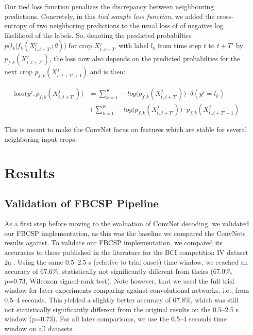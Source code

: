 Our tied loss function penalizes the discrepancy between neighbouring
predictions. Concretely, in this \emph{tied sample loss function}, we
added the cross-entropy of two neighboring predictions to the usual loss
of of negative log likelihood of the labels. So, denoting the predicted
probabilties $p\big(l_k|f_k(X^j_{t..t+T'};\theta)\big)$ for crop
$X^j_{t..t+T'}$ with label $l_k$ from time step $t$ to $t+T'$ by
$p_{f,k}(X^j_{t..t+T'})$, the loss now also depends on the predicted
probabilties for the next crop $p_{f,k}(X^j_{t..t+T'+1})$ and is then:
% 

\begin{equation}
\begin{split}
 \textrm{loss}\big(y^j, p_{f,k}(X^j_{t..t+T'})\big) &= \sum_{k=1}^{K}-log\big(p_{f,k}(X^j_{t..t+T'})\big)\cdot \delta(y^j=l_k) \\
 &+ \sum_{k=1}^{K}-log\big(p_{f,k}(X^j_{t..t+T'})\big) \cdot p_{f,k}(X^j_{t..t+T'+1})
\end{split}
\end{equation}



This is meant to make the ConvNet focus on features which are stable for
several neighboring input crops.

\section{Results}\label{results}

\subsection{Validation of FBCSP Pipeline}\label{validation-of-fbcsp-pipeline}

    As a first step before moving to the evaluation of ConvNet decoding, we
validated our FBCSP implementation, as this was the baseline we compared
the ConvNets results against. To validate our FBCSP implementation, we
compared its accuracies to those published in the literature for the BCI
competition IV dataset 2a \citep{sakhavi_parallel_2015}.
Using the same 0.5--2.5 s (relative to trial onset) time window, we
reached an accuracy of 67.6\%, statistically not significantly different
from theirs (67.0\%, p=0.73, Wilcoxon signed-rank test). Note however,
that we used the full trial window for later experiments comparing
against convolutional networks, i.e., from 0.5--4 seconds. This yielded
a slightly better accuracy of 67.8\%, which was still not statistically
significantly different from the original results on the 0.5--2.5 s
window (p=0.73). For all later comparisons, we use the 0.5--4 seconds
time window on all datasets.

